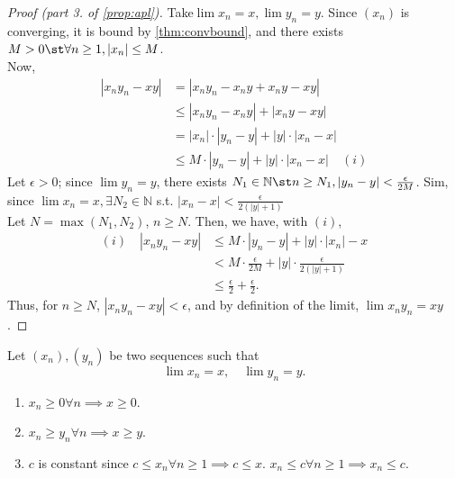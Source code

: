 \documentclass[12pt]{article}
\begin{document}
\begin{proof}[Proof (part 3. of \cref{prop:apl})]
  Take\footnotemark $\lim x_n = x, \lim y_n = y$. Since $(x_n)$ is converging, it is bound by \cref{thm:convbound}, and there exists $M > 0 \st \forall n \geq 1, |x_n| \leq M$.\\
  Now, \begin{align*}
    |x_n y_n - xy| &= |x_n y_n - x_n y + x_n y - xy|\\
    & \leq |x_n y_n - x_n y| + |x_n y - xy|\\
    &= |x_n| \cdot |y_n - y| + |y|\cdot |x_n - x|\\
    &\leq M \cdot |y_n - y| + |y|\cdot |x_n -x| \quad (i)
  \end{align*}
  Let $\epsilon > 0$; since $\lim y_n = y$, there exists $N_1 \in \mathbb{N} \st n \geq N_1, |y_n - y| < \frac{\epsilon}{2M}$. Sim, since $\lim x_n = x, \exists N_2 \in \mathbb{N}$ s.t. $|x_n - x|  <\frac{\epsilon}{2(|y|+1)}$\\
  Let $N = \max (N_1, N_2)$, $n \geq N$. Then, we have, with $(i)$,
  \begin{align*}
    (i) \quad |x_n y_n - xy| &\leq M\cdot |y_n - y| + |y| \cdot |x_n| - x\\
    &< M\cdot \frac{\epsilon}{2M} + |y|\cdot \frac{\epsilon}{2 (|y|+1)}\\
    &\leq \frac{\epsilon}{2} + \frac{\epsilon}{2}.
  \end{align*}
  Thus, for $n \geq N$, $|x_n y_n - xy| < \epsilon$, and by definition of the limit, $\lim x_n y_n = xy$.
\end{proof}

\begin{theorem}
  Let $(x_n), (y_n)$ be two sequences such that \[\lim x_n = x, \quad \lim y_n = y.\]
  \begin{enumerate}
    \item $x_n \geq 0 \forall n \implies x \geq 0$.
    \item $x_n \geq y_n \forall n \implies x \geq y$.
    \item $c$ is constant since $c \leq x_n \forall n \geq 1 \implies c \leq x$. $x_n \leq c \forall n \geq 1 \implies x_n \leq c$.
  \end{enumerate}
\end{theorem}
\end{document}
